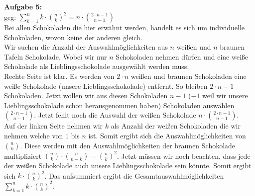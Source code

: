 \documentclass[a4paper]{scrartcl}
\begin{document}
	\begin{flushleft}
		\textbf{Aufgabe 5:}\\	
		geg: $\sum\limits_{k=1}^{n}k\cdot \binom{n}{k}^2 = n\cdot \binom{2\cdot n -1}{n-1}$\\
		Bei allen Schokoladen die hier erwähnt werden, handelt es sich um individuelle Schokoladen, wovon keine der anderen gleich.\\
		Wir suchen die Anzahl der Auswahlmöglichkeiten aus $n$ weißen und $n$ braunen Tafeln Schokolade. Wobei wir nur $n$ Schokoladen nehmen dürfen und eine weiße Schokolade als Lieblingsschokolade ausgewählt werden muss.\\[1em]
		Rechte Seite ist klar. Es werden von $2\cdot n$ weißen und braunen Schokoladen eine weiße Schokolade (unsere Lieblingsschokolade) entfernt. So bleiben $2\cdot n - 1$ Schokoladen. Jetzt wollen wir aus diesen Schokoladen $n-1$ ($-1$ weil wir unsere Lieblingsschokolade schon herausgenommen haben) Schokoladen auswählen $\binom{2\cdot n -1}{n-1}$. Jetzt  fehlt noch die Auswahl der weißen Schokolade $n\cdot\binom{2\cdot n -1}{n-1}$.\\[1em]
		Auf der linken Seite nehmen wir $k$ als Anzahl der weißen Schokoladen die wir nehmen welche von $1$ bis $n$ ist. Somit ergibt sich die Auswahlmöglichkeiten von $\binom{n}{k}$. Diese werden mit den Auswahlmöglichkeiten der braunen Schokolade multipliziert $\binom{n}{k}\cdot\binom{n}{n-k}=\binom{n}{k}^2$. Jetzt müssen wir noch beachten, dass jede der weißen Schokolade auch unsere Lieblingsschokolade sein könnte. Somit ergibt sich $k\cdot\binom{n}{k}^2$. Das aufsummiert ergibt die Gesamtauswahlmöglichkeiten $\sum\limits_{k=1}^{n}k\cdot \binom{n}{k}^2$.
	\end{flushleft}
\end{document}
